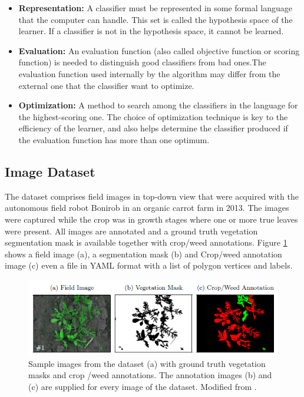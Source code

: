 \documentclass[12pt]{article}
\numberwithin{equation}{section}
\numberwithin{table}{section}
\numberwithin{figure}{section}
\begin{document}
\begin{itemize}

\item \textbf{Representation:} A classifier must be represented in some formal language that the computer can handle. This set is called the hypothesis space of the learner. If a classifier is not in the hypothesis space, it cannot be learned. 

\item \textbf{Evaluation:} An evaluation function (also called objective function or scoring function) is needed to distinguish good classifiers from bad ones.The evaluation function used internally by the algorithm may differ from the external one that the classifier want to optimize.

\item \textbf{Optimization:} A method to search among the classifiers in the language for the highest-scoring one. The choice of optimization technique is key to the efficiency of the learner, and also helps determine the classifier produced if the evaluation function has more than one optimum.
\end{itemize}


\subsection{Image Dataset}

The dataset comprises field images in top-down view that were acquired with the autonomous field robot Bonirob\cite{BOSH} in an organic carrot farm in 2013. The images were captured while the crop was in growth stages where one or more true leaves were present. All images are annotated and a ground truth vegetation segmentation mask is available together with crop/weed annotations. Figure \ref{figure1} shows a field image (a), a segmentation mask (b) and Crop/weed annotation image (c) even a file in YAML format with a list of polygon vertices and labels.

\begin{figure}[H] \centering
	\includegraphics[width=1\textwidth]{image1.png}
	\caption{Sample images from the dataset (a) with ground truth vegetation masks
		and crop /weed annotations. The annotation images (b) and (c) are supplied for
		every image of the dataset. Modified from \cite{Haug2015}. }
	\label{figure1}
\end{figure}
\end{document}
